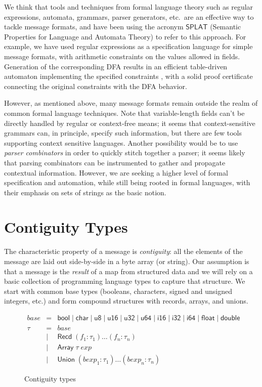 \documentclass[svgnames]{llncs}
\newcommand{\etc}{etc.}
\newcommand{\konst}[1]{\ensuremath{\mathsf{#1}}}
\begin{document}
We think that tools and techniques from formal language theory such as
regular expressions, automata, grammars, parser generators, \etc\, are
an effective way to tackle message formats, and have been using the
acronym \konst{SPLAT} (Semantic Properties for Language and Automata
Theory) to refer to this approach. For example, we have used regular
expressions as a specification language for simple message formats,
with arithmetic constraints on the values allowed in
fields. Generation of the corresponding DFA results in an efficient
table-driven automaton implementing the specified constraints \cite{},
with a solid proof certificate connecting the original constraints
with the DFA behavior.

However, as mentioned above, many message formats remain outside the
realm of common formal language techniques.  Note that variable-length
fields can't be directly handled by regular or context-free means; it
seems that context-sensitive grammars can, in principle, specify such
information, but there are few tools supporting context sensitive
languages. Another possibility would be to use \emph{parser
  combinators} in order to quickly stitch together a parser; it seems
likely that parsing combinators can be instrumented to gather and
propagate contextual information. However, we are seeking a higher
level of formal specification and automation, while still being rooted
in formal languages, with their emphasis on sets of strings as the
basic notion.

\section {Contiguity Types}

The characteristic property of a message is \emph{contiguity}: all the
elements of the message are laid out side-by-side in a byte array (or
string). Our assumption is that a message is the \emph{result} of a
map from structured data and we will rely on a basic collection of
programming language types to capture that structure. We start with
common base types (booleans, characters, signed and unsigned integers,
\etc) and form compound structures with records, arrays, and unions.

\begin{figure}
\[
\begin{array}{rcl}
 \mathit{base} & = & \konst{bool} \mid \konst{char} \mid \konst{u8} \mid
 \konst{u16} \mid \konst{u32} \mid \konst{u64}  \mid \konst{i16} \mid
 \konst{i32} \mid \konst{i64} \mid \konst{float} \mid \konst{double} \\
 \tau & = & \mathit{base} \\
      & \mid & \konst{Recd}\; (f_1 : \tau_1) \ldots (f_n : \tau_n) \\
      & \mid & \konst{Array}\; \tau \; \mathit{exp} \\
      & \mid & \konst{Union}\; (\mathit{bexp}_1 : \tau_1) \ldots (\mathit{bexp}_n : \tau_n)
\end{array}
\]
\label{contig-types}
\caption{Contiguity types}
\end{figure}
\end{document}
